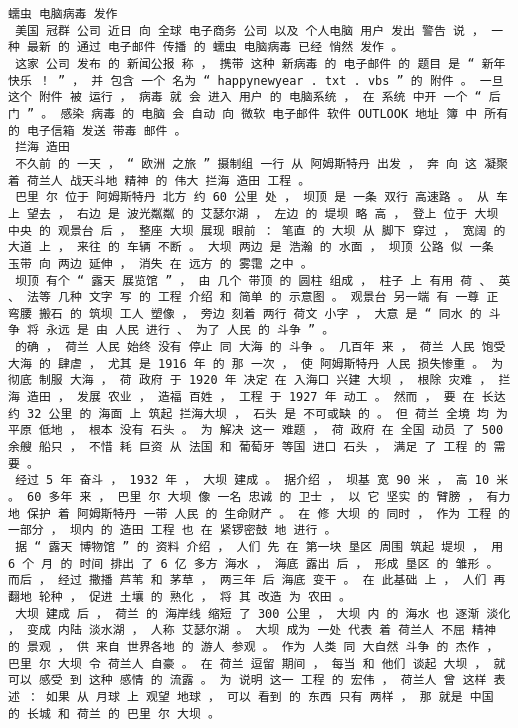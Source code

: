 \documentclass{article}
\begin{document}
\begin{Verbatim}[commandchars=\\\{\}]
 蠕虫 电脑病毒 发作 
 美国 冠群 公司 近日 向 全球 电子商务 公司 以及 个人电脑 用户 发出 警告 说 ， 一种 最新 的 通过 电子邮件 传播 的 蠕虫 电脑病毒 已经 悄然 发作 。 
 这家 公司 发布 的 新闻公报 称 ， 携带 这种 新病毒 的 电子邮件 的 题目 是 “ 新年快乐 ！ ” ， 并 包含 一个 名为 “ happynewyear . txt . vbs ” 的 附件 。 一旦 这个 附件 被 运行 ， 病毒 就 会 进入 用户 的 电脑系统 ， 在 系统 中开 一个 “ 后门 ” 。 感染 病毒 的 电脑 会 自动 向 微软 电子邮件 软件 OUTLOOK 地址 簿 中 所有 的 电子信箱 发送 带毒 邮件 。 
 拦海 造田 
 不久前 的 一天 ， “ 欧洲 之旅 ” 摄制组 一行 从 阿姆斯特丹 出发 ， 奔 向 这 凝聚 着 荷兰人 战天斗地 精神 的 伟大 拦海 造田 工程 。 
 巴里 尔 位于 阿姆斯特丹 北方 约 60 公里 处 ， 坝顶 是 一条 双行 高速路 。 从 车上 望去 ， 右边 是 波光粼粼 的 艾瑟尔湖 ， 左边 的 堤坝 略 高 ， 登上 位于 大坝 中央 的 观景台 后 ， 整座 大坝 展现 眼前 ： 笔直 的 大坝 从 脚下 穿过 ， 宽阔 的 大道 上 ， 来往 的 车辆 不断 。 大坝 两边 是 浩瀚 的 水面 ， 坝顶 公路 似 一条 玉带 向 两边 延伸 ， 消失 在 远方 的 雾霭 之中 。 
 坝顶 有个 “ 露天 展览馆 ” ， 由 几个 带顶 的 圆柱 组成 ， 柱子 上 有用 荷 、 英 、 法等 几种 文字 写 的 工程 介绍 和 简单 的 示意图 。 观景台 另一端 有 一尊 正 弯腰 搬石 的 筑坝 工人 塑像 ， 旁边 刻着 两行 荷文 小字 ， 大意 是 “ 同水 的 斗争 将 永远 是 由 人民 进行 、 为了 人民 的 斗争 ” 。 
 的确 ， 荷兰 人民 始终 没有 停止 同 大海 的 斗争 。 几百年 来 ， 荷兰 人民 饱受 大海 的 肆虐 ， 尤其 是 1916 年 的 那 一次 ， 使 阿姆斯特丹 人民 损失惨重 。 为 彻底 制服 大海 ， 荷 政府 于 1920 年 决定 在 入海口 兴建 大坝 ， 根除 灾难 ， 拦海 造田 ， 发展 农业 ， 造福 百姓 ， 工程 于 1927 年 动工 。 然而 ， 要 在 长达 约 32 公里 的 海面 上 筑起 拦海大坝 ， 石头 是 不可或缺 的 。 但 荷兰 全境 均 为 平原 低地 ， 根本 没有 石头 。 为 解决 这一 难题 ， 荷 政府 在 全国 动员 了 500 余艘 船只 ， 不惜 耗 巨资 从 法国 和 葡萄牙 等国 进口 石头 ， 满足 了 工程 的 需要 。 
 经过 5 年 奋斗 ， 1932 年 ， 大坝 建成 。 据介绍 ， 坝基 宽 90 米 ， 高 10 米 。 60 多年 来 ， 巴里 尔 大坝 像 一名 忠诚 的 卫士 ， 以 它 坚实 的 臂膀 ， 有力 地 保护 着 阿姆斯特丹 一带 人民 的 生命财产 。 在 修 大坝 的 同时 ， 作为 工程 的 一部分 ， 坝内 的 造田 工程 也 在 紧锣密鼓 地 进行 。 
 据 “ 露天 博物馆 ” 的 资料 介绍 ， 人们 先 在 第一块 垦区 周围 筑起 堤坝 ， 用 6 个 月 的 时间 排出 了 6 亿 多方 海水 ， 海底 露出 后 ， 形成 垦区 的 雏形 。 而后 ， 经过 撒播 芦苇 和 茅草 ， 两三年 后 海底 变干 。 在 此基础 上 ， 人们 再 翻地 轮种 ， 促进 土壤 的 熟化 ， 将 其 改造 为 农田 。 
 大坝 建成 后 ， 荷兰 的 海岸线 缩短 了 300 公里 ， 大坝 内 的 海水 也 逐渐 淡化 ， 变成 内陆 淡水湖 ， 人称 艾瑟尔湖 。 大坝 成为 一处 代表 着 荷兰人 不屈 精神 的 景观 ， 供 来自 世界各地 的 游人 参观 。 作为 人类 同 大自然 斗争 的 杰作 ， 巴里 尔 大坝 令 荷兰人 自豪 。 在 荷兰 逗留 期间 ， 每当 和 他们 谈起 大坝 ， 就 可以 感受 到 这种 感情 的 流露 。 为 说明 这一 工程 的 宏伟 ， 荷兰人 曾 这样 表述 ： 如果 从 月球 上 观望 地球 ， 可以 看到 的 东西 只有 两样 ， 那 就是 中国 的 长城 和 荷兰 的 巴里 尔 大坝 。 

\end{Verbatim}
\end{document}
